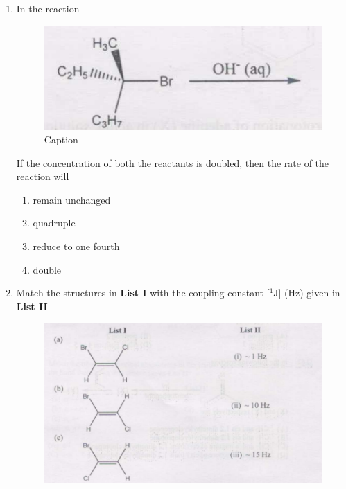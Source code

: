 \documentclass[journal,12pt,onecolumn]{IEEEtran}
\theoremstyle{remark}
\begin{document}
\begin{enumerate}
\begin{multicols}{2}
\begin{enumerate}
     \item   Y < X < Z
     \item   Y < Z < X
     \item   X < Z < Y
     \item   X < Y < Z
\end{enumerate}
\end{multicols}

  

\item  In the reaction \hfill{}

\begin{figure}
    \centering
   \includegraphics[width=0.5\columnwidth]{figs/image2.png}
    \caption{Caption}
    \label{fig:figure2}
\end{figure}


If the concentration of both the reactants is doubled, then the rate of the reaction will

\begin{multicols}{2}
\begin{enumerate}
     \item   remain unchanged
     \item   quadruple
     \item   reduce to one fourth
     \item   double
\end{enumerate}
\end{multicols}

  

\item  Match the structures in \textbf{List I} with the coupling constant [$^1$J] (Hz) given in \textbf{List II} \hfill{}

\begin{figure}
    \centering
   \includegraphics[width=0.5\columnwidth]{figs/image3.png}
    \caption{}
    \label{fig:image3}
\end{figure}



\end{enumerate}
\end{document}
